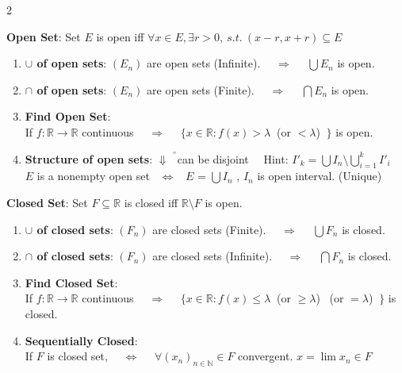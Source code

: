 \documentclass[9pt]{article}
\newcommand{\np}{{\tiny $^{^{^\ominus}}$}}
\begin{document}
\vspace{-10pt}
\begin{multicols}{2}

\textbf{Open Set}: Set $E$ is open iff $\forall x\in E,\exists r>0, \ s.t. \ (x-r,x+r)\subseteq E$

\begin{enumerate}[itemsep=-3pt, topsep=-2pt]
    \item \textbf{$\cup$ of open sets}: {\footnotesize $(E_n)$ are open sets (Infinite). \ \ $\Rightarrow$ \ \  $\bigcup E_n$ is open.}
    \item \textbf{$\cap$ of open sets}: {\footnotesize $(E_n)$ are open sets (Finite). \ \ $\Rightarrow$ \ \  $\bigcap E_n$ is open.}
    \item \textbf{Find Open Set}: \\
    {\footnotesize If $f:\mathbb{R}\to\mathbb{R}$ continuous \ \ $\Rightarrow$ \ \ $\{x\in\mathbb{R}:f(x)>\lambda \ $ {\tiny (or $<\lambda$)} $ \ \}$ is open.}
    \item \textbf{Structure of open sets}: \hspace{20pt} {\footnotesize $\Downarrow$ \np can be disjoint} \ \ {\tiny Hint: $I'_k=\bigcup I_n\setminus\bigcup^k_{i=1} I'_{i}$} \\
    {\small $E$ is a nonempty open set \ $\Leftrightarrow$ \ $E$ = $\bigcup I_n$ , $I_n$ is open interval. (Unique)}
\end{enumerate}

\columnbreak

\textbf{Closed Set}: Set $F\subseteq\mathbb{R}$ is closed iff $\mathbb{R}\setminus F$ is open.

\begin{enumerate}[itemsep=-3pt, topsep=-2pt]
    \item \textbf{$\cup$ of closed sets}: {\footnotesize $(F_n)$ are closed sets (Finite). \ \ $\Rightarrow$ \ \  $\bigcup F_n$ is closed.}
    \item \textbf{$\cap$ of closed sets}: {\footnotesize $(F_n)$ are closed sets (Infinite). \ \ $\Rightarrow$ \ \  $\bigcap F_n$ is closed.}
    \item \textbf{Find Closed Set}: \\
    {\footnotesize If $f:\mathbb{R}\to\mathbb{R}$ continuous \ \ $\Rightarrow$ \ \ $\{x\in\mathbb{R}:f(x)\leq\lambda \ $ {\tiny (or $\geq\lambda$) \ (or $=\lambda$)} $ \ \}$ is closed.}
    \item \textbf{Sequentially Closed}: \\
    {\small If $F$ is closed set, \ \ $\Leftrightarrow$ \ \ $\forall(x_n)_{n\in\mathbb{N}}\in F$ convergent. $x=\lim x_n\in F$}
\end{enumerate}

\end{multicols}
\vspace{-10pt}
\end{document}
